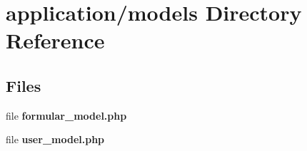 \section{application/models Directory Reference}
\label{dir_9225163d255b057eeda1b667aba36cd3}
\subsection*{Files}
\begin{DoxyCompactItemize}
\item 
file {\bf formular\-\_\-model.\-php}
\item 
file {\bf user\-\_\-model.\-php}
\end{DoxyCompactItemize}
